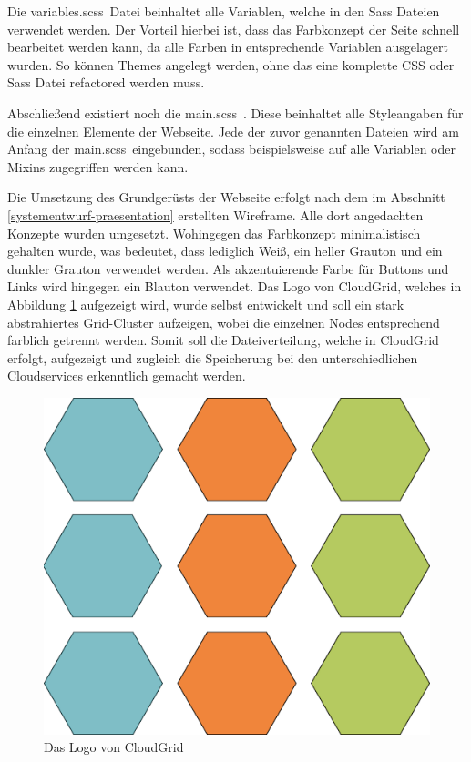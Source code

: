Die \frqq variables.scss\flqq\ Datei beinhaltet alle Variablen, welche in den \ac{Sass} Dateien verwendet werden.
Der Vorteil hierbei ist, dass das Farbkonzept der Seite schnell bearbeitet werden kann, da alle Farben in entsprechende Variablen ausgelagert wurden.
So können Themes angelegt werden, ohne das eine komplette \ac{CSS} oder \ac{Sass} Datei refactored werden muss.

Abschließend existiert noch die \frqq main.scss\flqq\ .
Diese beinhaltet alle Styleangaben für die einzelnen Elemente der Webseite.
Jede der zuvor genannten Dateien wird am Anfang der \frqq main.scss\flqq\ eingebunden, sodass beispielsweise auf alle Variablen oder Mixins zugegriffen werden kann.

Die Umsetzung des Grundgerüsts der Webseite erfolgt nach dem im Abschnitt \ref{systementwurf-praesentation} erstellten Wireframe.
Alle dort angedachten Konzepte wurden umgesetzt.
Wohingegen das Farbkonzept minimalistisch gehalten wurde, was bedeutet, dass lediglich Weiß, ein heller Grauton und ein dunkler Grauton verwendet werden.
Als akzentuierende Farbe für Buttons und Links wird hingegen ein Blauton verwendet.
Das Logo von CloudGrid, welches in Abbildung \ref{fig-demo-logo} aufgezeigt wird, wurde selbst entwickelt und soll ein stark abstrahiertes Grid-Cluster aufzeigen, wobei die einzelnen Nodes entsprechend farblich getrennt werden.
Somit soll die Dateiverteilung, welche in CloudGrid erfolgt, aufgezeigt und zugleich die Speicherung bei den unterschiedlichen Cloudservices erkenntlich gemacht werden.

\begin{figure}[H]
  \centering
  \includegraphics[scale=0.04]{resources/Bilder_Kapitel_5/logo.png}
  \caption{Das Logo von CloudGrid}
  \label{fig-demo-logo}
\end{figure}

